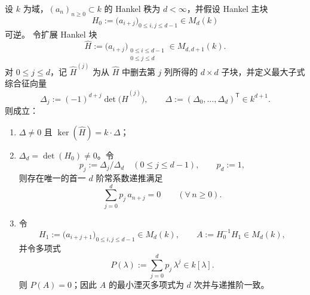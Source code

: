 \begin{theorem}\label{thm:xi-hankel-maximal-minor-syndrome-normal-form-uniqueness}
设 \(k\) 为域，\((a_n)_{n\ge 0}\subset k\) 的 Hankel 秩为 \(d<\infty\)，并假设 Hankel 主块
\[
H_0:=\bigl(a_{i+j}\bigr)_{0\le i,j\le d-1}\in M_d(k)
\]
可逆。
令扩展 Hankel 块
\[
\widehat H:=\bigl(a_{i+j}\bigr)_{\substack{0\le i\le d-1\\ 0\le j\le d}}\in M_{d,d+1}(k).
\]
对 \(0\le j\le d\)，记 \(\widehat H^{(j)}\) 为从 \(\widehat H\) 中删去第 \(j\) 列所得的 \(d\times d\) 子块，并定义最大子式综合征向量
\[
\Delta_j:=(-1)^{d+j}\det\!\bigl(\widehat H^{(j)}\bigr),
\qquad
\Delta:=(\Delta_0,\dots,\Delta_d)^{\mathsf T}\in k^{d+1}.
\]
则成立：
\begin{enumerate}
  \item \(\Delta\neq 0\) 且 \(\ker(\widehat H)=k\cdot \Delta\)；
  \item \(\Delta_d=\det(H_0)\neq 0\)。令
  \[
  p_j:=\Delta_j/\Delta_d\quad(0\le j\le d-1),
  \qquad
  p_d:=1,
  \]
  则存在唯一的首一 \(d\) 阶常系数递推满足
  \[
  \sum_{j=0}^{d}p_j\,a_{n+j}=0\qquad(\forall\,n\ge 0).
  \]
  \item 令
  \[
  H_1:=\bigl(a_{i+j+1}\bigr)_{0\le i,j\le d-1}\in M_d(k),
  \qquad
  A:=H_0^{-1}H_1\in M_d(k),
  \]
  并令多项式
  \[
  P(\lambda):=\sum_{j=0}^{d}p_j\,\lambda^{j}\in k[\lambda].
  \]
  则 \(P(A)=0\)；因此 \(A\) 的最小湮灭多项式为 \(d\) 次并与递推阶一致。
\end{enumerate}
\end{theorem}
